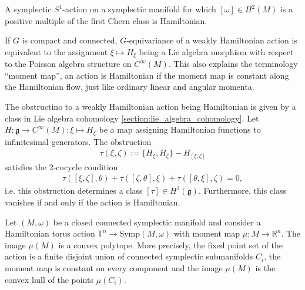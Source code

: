 
    \begin{property}
        A symplectic $S^1$-action on a symplectic manifold for which $[\omega]\in H^2(M)$ is a positive multiple of the first Chern class is Hamiltonian.
    \end{property}

    \begin{property}[Obstruction]
        If $G$ is compact and connected, $G$-equivariance of a weakly Hamiltonian action is equivalent to the assignment $\xi\mapsto H_\xi$ being a Lie algebra morphism with respect to the Poisson algebra structure on $C^\infty(M)$. This also explains the terminology ``moment map'', an action is Hamiltonian if the moment map is constant along the Hamiltonian flow, just like ordinary linear and angular momenta.

        The obstructino to a weakly Hamiltonian action being Hamiltonian is given by a class in Lie algebra cohomology \ref{section:lie_algebra_cohomology}. Let $H:\mathfrak{g}\rightarrow C^\infty(M):\xi\mapsto H_\xi$ be a map assigning Hamiltonian functions to infinitesimal generators. The obstruction
        \begin{gather}
            \tau(\xi,\zeta) := \{H_\xi,H_\zeta\} - H_{[\xi,\zeta]}
        \end{gather}
        satisfies the 2-cocycle condition
        \begin{gather}
            \tau([\xi,\zeta],\theta) + \tau([\zeta,\theta],\xi) + \tau([\theta,\xi],\zeta) = 0,
        \end{gather}
        i.e. this obstruction determines a class $[\tau]\in H^2(\mathfrak{g})$. Furthermore, this class vanishes if and only if the action is Hamiltonian.
    \end{property}

    \begin{theorem}
        Let $(M,\omega)$ be a closed connected symplectic manifold and consider a Hamiltonian torus action $\mathbb{T}^n\rightarrow\text{Symp}(M,\omega)$ with moment map $\mu:M\rightarrow\mathbb{R}^n$. The image $\mu(M)$ is a convex polytope. More precisely, the fixed point set of the action is a finite disjoint union of connected symplectic submanifolds $C_i$, the moment map is constant on every component and the image $\mu(M)$ is the convex hull of the points $\mu(C_i)$.
    \end{theorem}

